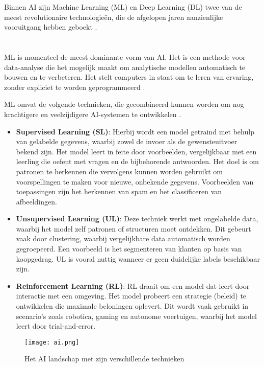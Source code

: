 Binnen AI zijn Machine Learning (ML) en Deep Learning (DL) twee van de meest revolutionaire technologieën, die de afgelopen jaren aanzienlijke vooruitgang hebben geboekt \autocite{SharifaniEtAl2023}.

\section{}%
\label{sec:machine-learning}

ML is momenteel de meest dominante vorm van AI. Het is een methode voor data-analyse die het mogelijk maakt om analytische modellen automatisch te bouwen en te verbeteren. Het stelt computers in staat om te leren van ervaring, zonder expliciet te worden geprogrammeerd \autocite{SharifaniEtAl2023}.

ML omvat de volgende technieken, die gecombineerd kunnen worden om nog krachtigere en veelzijdigere AI-systemen te ontwikkelen \autocite{Kouassi2023}. 

\begin{itemize}
  \item \textbf{Supervised Learning (SL)}: Hierbij wordt een model getraind met behulp van gelabelde gegevens, waarbij zowel de invoer als de gewensteuitvoer bekend zijn. Het model leert in feite door voorbeelden, vergelijkbaar met een leerling die oefent met vragen en de bijbehorende antwoorden. Het doel is om patronen te herkennen die vervolgens kunnen worden gebruikt om voorspellingen te maken voor nieuwe, onbekende gegevens. Voorbeelden van toepassingen zijn het herkennen van spam en het classificeren van afbeeldingen.
  \item \textbf{Unsupervised Learning (UL)}: Deze techniek werkt met ongelabelde data, waarbij het model zelf patronen of structuren moet ontdekken. Dit gebeurt vaak door clustering, waarbij vergelijkbare data automatisch worden gegroepeerd. Een voorbeeld is het segmenteren van klanten op basis van koopgedrag. UL is vooral nuttig wanneer er geen duidelijke labels beschikbaar zijn. 
  \item \textbf{Reinforcement Learning (RL)}: RL draait om een model dat leert door interactie met een omgeving. Het model probeert een strategie (beleid) te ontwikkelen die maximale beloningen oplevert. Dit wordt vaak gebruikt in scenario's zoals robotica, gaming en autonome voertuigen, waarbij het model leert door trial-and-error. 
\end{itemize}

\begin{figure}
  \centering
  \texttt{[image: ai.png]}
  \caption[Figuur 1]{\label{fig:ai}Het AI landschap met zijn verschillende technieken \autocite{Kouassi2023}}
\end{figure}


